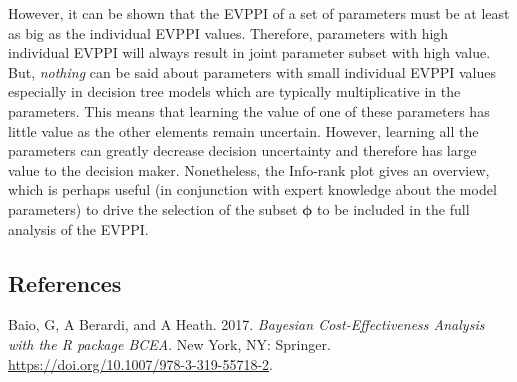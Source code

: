 \documentclass[]{article}
\begin{document}
However, it can be shown that the EVPPI of a set of parameters must be
at least as big as the individual EVPPI values. Therefore, parameters
with high individual EVPPI will always result in joint parameter subset
with high value. But, \emph{nothing} can be said about parameters with
small individual EVPPI values especially in decision tree models which
are typically multiplicative in the parameters. This means that learning
the value of one of these parameters has little value as the other
elements remain uncertain. However, learning all the parameters can
greatly decrease decision uncertainty and therefore has large value to
the decision maker. Nonetheless, the Info-rank plot gives an overview,
which is perhaps useful (in conjunction with expert knowledge about the
model parameters) to drive the selection of the subset \(\bm\phi\) to be
included in the full analysis of the EVPPI.

\hypertarget{references}{%
\subsection*{References}\label{references}}

\hypertarget{refs}{}
\leavevmode\hypertarget{ref-Baioetal:2017}{}%
Baio, G, A Berardi, and A Heath. 2017. \emph{Bayesian Cost-Effectiveness
Analysis with the R package BCEA}. New York, NY: Springer.
\url{https://doi.org/10.1007/978-3-319-55718-2}.
\end{document}
